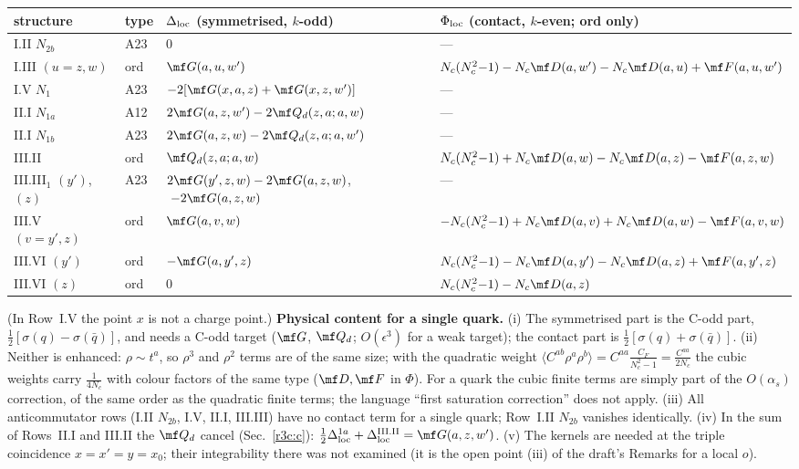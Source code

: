 \begin{center}\small\renewcommand{\arraystretch}{1.25}
\begin{tabular}{|l|l|l|l|}\hline
structure & type & $\Delta_{\rm loc}$ (symmetrised, $k$-odd) & $\Phi_{\rm loc}$ (contact, $k$-even; ord only)\\\hline
I.II $N_{2b}$ & A23 & $0$ & ---\\
I.III $(u{=}z,w)$ & ord & $\mf G(a,u,w')$ & $N_c(N_c^2{-}1)-N_c\mf D(a,w')-N_c\mf D(a,u)+\mf F(a,u,w')$\\
I.V $N_1$ & A23 & $-2[\mf G(x,a,z)+\mf G(x,z,w')]$ & ---\\
II.I $N_{1a}$ & A12 & $2\mf G(a,z,w')-2\mf Q_d(z,a;a,w)$ & ---\\
II.I $N_{1b}$ & A23 & $2\mf G(a,z,w)-2\mf Q_d(z,a;a,w')$ & ---\\
III.II & ord & $\mf Q_d(z,a;a,w)$ & $N_c(N_c^2{-}1)+N_c\mf D(a,w)-N_c\mf D(a,z)-\mf F(a,z,w)$\\
III.III$_1$ $(y')$, $(z)$ & A23 & $2\mf G(y',z,w)-2\mf G(a,z,w)$, $\ -2\mf G(a,z,w)$ & ---\\
III.V $(v{=}y',z)$ & ord & $\mf G(a,v,w)$ & $-N_c(N_c^2{-}1)+N_c\mf D(a,v)+N_c\mf D(a,w)-\mf F(a,v,w)$\\
III.VI $(y')$ & ord & $-\mf G(a,y',z)$ & $N_c(N_c^2{-}1)-N_c\mf D(a,y')-N_c\mf D(a,z)+\mf F(a,y',z)$\\
III.VI $(z)$ & ord & $0$ & $N_c(N_c^2{-}1)-N_c\mf D(a,z)$\\\hline
\end{tabular}\end{center}
(In Row~I.V the point $x$ is not a charge point.) \textbf{Physical content for a single quark.} (i) The symmetrised part is the C-odd part, $\frac12[\sigma(q)-\sigma(\bar q)]$, and needs a C-odd target ($\mf G$, $\mf Q_d$; $O(\epsilon^3)$ for a weak target); the contact part is $\frac12[\sigma(q)+\sigma(\bar q)]$. (ii) Neither is enhanced: $\rho\sim t^a$, so $\rho^3$ and $\rho^2$ terms are of the same size; with the quadratic weight $\langle C^{ab}\rho^a\rho^b\rangle=C^{aa}\frac{C_F}{N_c^2-1}=\frac{C^{aa}}{2N_c}$ the cubic weights carry $\frac{1}{4N_c}$ with colour factors of the same type ($\mf D,\mf F$ in $\Phi$). For a quark the cubic finite terms are simply part of the $O(\alpha_s)$ correction, of the same order as the quadratic finite terms; the language ``first saturation correction'' does not apply. (iii) All anticommutator rows (I.II $N_{2b}$, I.V, II.I, III.III) have no contact term for a single quark; Row~I.II $N_{2b}$ vanishes identically. (iv) In the sum of Rows~II.I and III.II the $\mf Q_d$ cancel (Sec.~\ref{r3c:c}): $\frac12\Delta_{\rm loc}^{1a}+\Delta_{\rm loc}^{\rm III.II}=\mf G(a,z,w')$. (v) The kernels are needed at the triple coincidence $x=x'=y=x_0$; their integrability there was not examined (it is the open point (iii) of the draft's Remarks for a local $o$).

